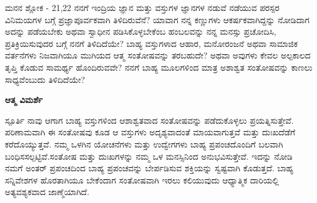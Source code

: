 \begin{mananam}{\mananamfont ಮನನ ಶ್ಲೋಕ - \textenglish{21,22}}
\footnotesize \mananamtext ನನಗೆ ಇಂದ್ರಿಯ ಜ್ಞಾನ  ಮತ್ತು ವಸ್ತುಗಳ ಜ್ಞಾನಗಳ ನಡುವೆ ನಡೆಯುವ ಪರಸ್ಪರ ವಿನಿಮಯಗಳ ಬಗ್ಗೆ ಪ್ರಜ್ಞಾಪೂರ್ವಕವಾಗಿ  ತಿಳಿದಿರುವೆನೆ? ಯಾವಾಗ ನನ್ನ ಕಣ್ಣುಗಳು ಆಕರ್ಷಕವಾಗಿದ್ದನ್ನು ನೋಡಿದಾಗ ಅದನ್ನು ಪಡೆಯಬೇಕು ಅಥವಾ ಸ್ವಾಧೀನ ಪಡಿಸಿಕೊಳ್ಳಬೇಕೆಂಬ ಹಂಬಲವನ್ನು ನನ್ನ ಮನಸ್ಸು ಪ್ರಚೋದಿಸಿ, ಪ್ರತಿಕ್ರಿಯಿಸುವುದರ ಬಗ್ಗೆ ನನಗೆ ತಿಳಿದಿದೆಯೇ? ಬಾಹ್ಯ ವಸ್ತುಗಳಾದ ಆಹಾರ, ಮನೋರಂಜನೆ ಅಥವಾ ಸಾಮಾಜಿಕ ವರ್ತನೆಗಳು ನಿಜವಾಗಿಯೂ ಮುಗಿಯದ ಆತ್ಮ ಸಂತೋಷವನ್ನು ತರಬಹುದೇ? ಅಥವಾ ಅವುಗಳು ಕೇವಲ ಅಲ್ಪಕಾಲದ ತೃಪ್ತಿ ಕೊಡುವ ಸಾಮರ್ಥ್ಯ ಹೊಂದಿರುವವೇ? ನನಗೆ ಬಾಹ್ಯ ಮೂಲಗಳಿಂದ ಮಾತ್ರ ಅಶಾಶ್ವತ ಸಂತೋಷವನ್ನು ಕಾಣಲು ಸಾಧ್ಯವೆಂಬುದು ತಿಳಿದಿದೆಯೇ?
\end{mananam}
\WritingHand\enspace\textbf{ಆತ್ಮ ವಿಮರ್ಶೆ}\\
\begin{inspiration}{\mananamfont ಸ್ಪೂರ್ತಿ}
\footnotesize \mananamtext ನಾವು ಆಗಾಗ ಬಾಹ್ಯ ವಸ್ತುಗಳಿಂದ ಆಶಾಶ್ವತವಾದ ಸಂತೋಷವನ್ನು ಪಡೆದುಕೊಳ್ಳಲು ಪ್ರಯತ್ನಿಸುತ್ತೇವೆ. ಪರಿಣಾಮವಾಗಿ ಈ ಸಂತೋಷವು ಕೂಡ ಆ ವಸ್ತುಗಳು ಅದೃಶ್ಯವಾದಂತೆ ಮಾಯವಾಗುತ್ತವೆ ಮತ್ತು ದುಃಖದೆಡೆಗೆ ಕರೆದೊಯ್ಯುತ್ತವೆ. ನಮ್ಮ ಒಳಗಿನ ಯೋಚನೆಗಳು ಮತ್ತು ಉದ್ವೇಗಗಳು ಬಾಹ್ಯ  ಪ್ರಪಂಚದೊಂದಿಗೆ ಬಲವಾಗಿ ಬಂಧಿಸಸಲ್ಪಟ್ಟಿವೆ.ಸಂತೋಷ ಮತ್ತು ದುಃಖಗಳನ್ನು ನಮ್ಮ ಒಳ ಮನಸ್ಸಿನಿಂದ ಅನುಭವಿಸುತ್ತೇವೆ. ಇದನ್ನು ನೋಡಿ ನಮಗೆ ಅಂತರ್ ಪ್ರಪಂಚದಿಂದ ಬಾಹ್ಯ ಪ್ರಪಂಚವನ್ನು ಬೇರ್ಪಡಿಸುವ ಶಕ್ತಿಯನ್ನು ಸ್ವಷ್ಟವಾಗಿ ಕೊಡುತ್ತದೆ.  ಬಾಹ್ಯ ಸನ್ನಿವೇಶಗಳ ಹೊರತಾಗಿಯೂ ಬೇಕೆಂದಾಗ ಸಂತೋಷವಾಗಿ ಇರಲು ಕಲಿಯುವುದು ಆಧ್ಯಾತ್ಮಿಕ ದಾರಿಯಲ್ಲಿ ಅತ್ಯವಶ್ಯಕವಾದ ಜಾಣ್ಮೆಯಾಗಿದೆ.
\end{inspiration}
\newpage


